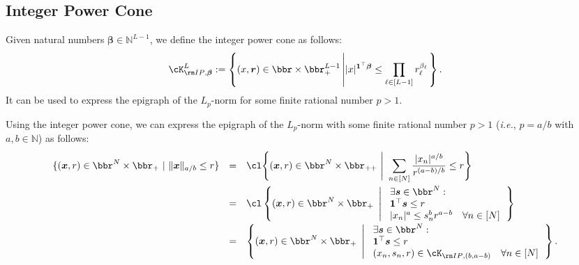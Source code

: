 \documentclass[mnsc, nonblindrev]{informswp}
\newcommand{\1}[1]{\mathds{1}{\left(#1\right)}}
\begin{document}
\begin{appendices}
\section{Integer Power Cone}
\label{sec:IntegerPowerCone}

Given natural numbers $\bm \beta \in \mathbb{N}^{L-1}$, we define the integer power cone as follows:
$$
\cK^L_{{\rm IP},\bm \beta} := \displaystyle \left\{ (x,\bm r) \in \bbr \times \bbr_+^{L-1}  \left| |x|^{\bm 1^\top \bm \beta} \leq \prod_{\ell \in [L-1]} r^{\beta_\ell}_\ell \right.\right\}.
$$
It can be used to express the epigraph of the $L_p$-norm for some finite rational number $p>1$.  

\begin{example}
Using the integer power cone, we can express the epigraph of the $L_p$-norm with some finite rational number $p>1$ (\textit{i.e.}, $p=a/b$ with $a,b \in \mathbb{N}$) as follows:
$$
\begin{array}{rcl}
\{(\bm x,r) \in \bbr^{N} \times \bbr_+ ~|~ \|\bm x\|_{a/b} \leq r \}
&=& \displaystyle \cl \Bigg\{ (\bm x,r) \in \bbr^{N} \times \bbr_{++} ~\Bigg|~ \sum_{n \in [N]} \frac{|x_n|^{a/b}}{r^{(a-b)/b}} \leq r \Bigg.\Bigg\} \\[5mm]
&=& \displaystyle \cl\left\{ (\bm x,r) \in \bbr^{N} \times \bbr_{+} ~\left|~
\begin{array}{ll}
\exists \bm s \in \bbr^N: \\
\bm 1^\top \bm s \leq r \\
|x_n|^a \leq s^b_n r^{a-b}  & \forall n \in [N]
\end{array}
\right.\right\} \\ [5mm]
&=& \displaystyle \left\{ (\bm x,r) \in \bbr^{N} \times \bbr_{+} ~\left|~
\begin{array}{ll}
\exists \bm s \in \bbr^N: \\
\bm 1^\top \bm s \leq r \\
(x_n,s_n,r) \in  \cK_{{\rm IP},(b,a-b)}  & \forall n \in [N]
\end{array}
\right.\right\}.
\end{array}
$$
\end{example}


\end{appendices}
\end{document}
